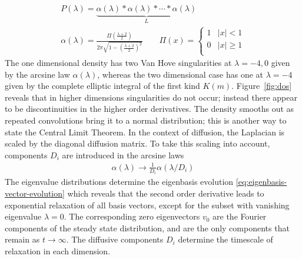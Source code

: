 \begin{align}
  P(\lambda)=\underbrace{
  \alpha(\lambda)*\alpha(\lambda)*\cdots*\alpha(\lambda)}_{L}\qquad\qquad\label{eq:mlap}\\
    \alpha(\lambda)=
      \frac{\Pi\left(\frac{\lambda+2}{2}\right)}{2\pi\sqrt{1-\left(\frac{\lambda+2}{2}\right)^2}}
    \qquad
    \Pi(x)=
      \begin{cases}
        1 & |x|<1\\
        0 & |x|\geq1\\
      \end{cases}
	\label{eq:laplacian-distribution}
\end{align}
The one dimensional density has two Van Hove singularities at $\lambda=-4,0$ given by the arcsine law $\alpha(\lambda)$, whereas the two dimensional case has one at $\lambda=-4$ given by the complete elliptic integral of the first kind $K(m)$. Figure~\ref{fig:dos} reveals that in higher dimensions singularities do not occur; instead there appear to be discontinuities in the higher order derivatives. The density smooths out as repeated convolutions bring it to a normal distribution; this is another way to state the Central Limit Theorem. In the context of diffusion, the Laplacian is scaled by the diagonal diffusion matrix. To take this scaling into account, components $D_i$ are introduced in the arcsine laws
\begin{align}
	\alpha(\lambda) \rightarrow \frac{1}{D_i}\alpha(\lambda/D_i)
\end{align}
The eigenvalue distributions determine the eigenbasis evolution  \eqref{eq:eigenbasis-vector-evolution} which reveals that the second order derivative leads to exponential relaxation of all basis vectors, except for the subset with vanishing eigenvalue $\lambda=0$. The corresponding zero eigenvectors $v_0$ are the Fourier components of the steady state distribution, and are the only components that remain as $t\rightarrow\infty$. The diffusive components $D_i$ determine the timescale of relaxation in each dimension.


